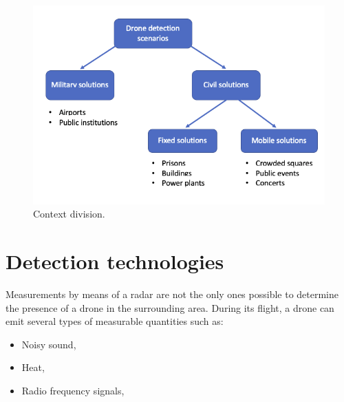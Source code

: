 \begin{figure}[h!]
    \centering
    \includegraphics[width=13cm]{imgs/Contexts groups.png}
    \caption{Context division.}
    \label{context}
\end{figure}

\newpage
\section{Detection technologies \cite{survey}}
Measurements by means of a radar are not the only ones possible to determine the presence of a drone in the surrounding area. During its flight, a drone can emit several types of measurable quantities such as:
\begin{itemize}
     \item Noisy sound,
         
    \item Heat,
        
    \item Radio frequency signals,
\end{itemize}

